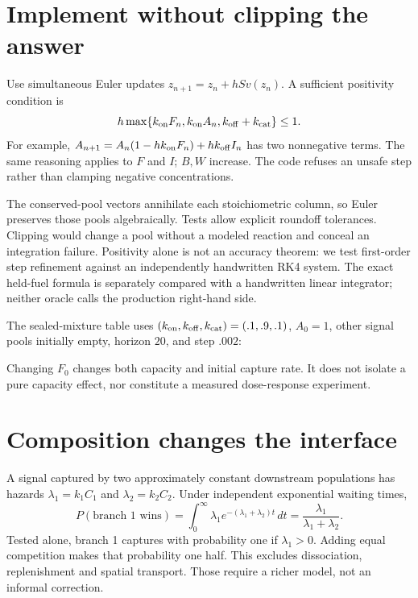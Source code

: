 \section{Implement without clipping the answer}
Use simultaneous Euler updates $z_{n+1}=z_n+hSv(z_n)$. A sufficient positivity
condition is
\begin{equation}
 h\max\{k_{\rm on}F_n,k_{\rm on}A_n,k_{\rm off}+k_{\rm cat}\}\le1.
 \label{eq:dna31-positive}
\end{equation}
For example, $A_{n+1}=A_n(1-hk_{\rm on}F_n)+hk_{\rm off}I_n$ has two
nonnegative terms. The same reasoning applies to $F$ and $I$; $B,W$ increase.
The code refuses an unsafe step rather than clamping negative concentrations.

The conserved-pool vectors annihilate each stoichiometric column, so Euler
preserves those pools algebraically. Tests allow explicit roundoff tolerances.
Clipping would change a pool without a modeled reaction and conceal an
integration failure. Positivity alone is not an accuracy theorem: we test
first-order step refinement against an independently handwritten RK4 system.
The exact held-fuel formula is separately compared with a handwritten linear
integrator; neither oracle calls the production right-hand side.

The sealed-mixture table uses $(k_{\rm on},k_{\rm off},k_{\rm cat})=(.1,.9,.1)$,
$A_0=1$, other signal pools initially empty, horizon $20$, and step $.002$:
\begin{center}\end{center}
Changing $F_0$ changes both capacity and initial capture rate. It does not isolate
a pure capacity effect, nor constitute a measured dose-response experiment.

\section{Composition changes the interface}
A signal captured by two approximately constant downstream populations has
hazards $\lambda_1=k_1C_1$ and $\lambda_2=k_2C_2$. Under independent exponential
waiting times,
\[
 P(\text{branch 1 wins})=
 \int_0^\infty\lambda_1e^{-(\lambda_1+\lambda_2)t}\,dt
 =\frac{\lambda_1}{\lambda_1+\lambda_2}.
\]
Tested alone, branch 1 captures with probability one if $\lambda_1>0$.
Adding equal competition makes that probability one half.
This  excludes dissociation, replenishment and
spatial transport. Those require a richer model, not an informal correction.

